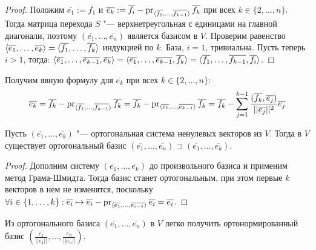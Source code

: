 \begin{proof}
	Положим $\overline{e_1} := \overline{f_1}$ и $\overline{e_k} := \overline{f_i} \hm{-} \pr_{\langle\overline{f_1}, \dots, \overline{f_{k - 1}}\rangle}\overline{f_k}$ при всех $k \in \{2, \dots, n\}$. Тогда матрица перехода $S$ "--- верхнетреугольная с единицами на главной диагонали, поэтому $(\overline{e_1}, \dotsc, \overline{e_n})$ является базисом в $V$. Проверим равенство $\langle\overline{e_1}, \dots, \overline{e_k}\rangle \hm= \langle\overline{f_1}, \dots, \overline{f_k}\rangle$ индукцией по $k$. База, $i = 1$, тривиальна. Пусть теперь $i > 1$, тогда: $\langle\overline{e_1}, \dots, \overline{e_{k-1}}, \overline{e_k}\rangle \hm= \langle\overline{e_1}, \dots, \overline{e_{k-1}}, \overline{f_k}\rangle = \langle\overline{f_1}, \dots, \overline{f_{k-1}}, \overline{f_i}\rangle$.
\end{proof}

\begin{note}
	Получим явную формулу для $\overline{e_k}$ при всех $k \in \{2, \dots, n\}$:
	\[\overline{e_k} = \overline{f_k} - \operatorname{pr}_{\langle\overline{f_1}, \dots, \overline{f_{k - 1}}\rangle}{\overline{f_k}} = \overline{f_k} - \operatorname{pr}_{\langle\overline{e_1}, \dots, \overline{e_{k - 1}}\rangle}{\overline{f_k}} = \overline{f_k} - \sum_{j = 1}^{k - 1}\frac{(\overline{f_k}, \overline{e_j})}{||\overline{e_j}||^2}\overline{e_j}\]
\end{note}

\begin{corollary}
	Пусть $(\overline{e_1}, \dots, \overline{e_k})$ "--- ортогональная система ненулевых векторов из $V$. Тогда в $V$ существует ортогональный базис $(\overline{e_1}, \dots, \overline{e_n}) \supset (\overline{e_1}, \dots, \overline{e_k})$.
\end{corollary}

\begin{proof}
	Дополним систему $(\overline{e_1}, \dots, \overline{e_k})$ до произвольного базиса и применим метод Грама-Шмидта. Тогда базис станет ортогональным, при этом первые $k$ векторов в нем не изменятся, поскольку $\forall i \hm{\in} \{1, \dots, k\}: \overline{e_i} \hm{\mapsto} \overline{e_i} - \pr_{\langle\overline{e_1}, \dots, \overline{e_{i - 1}}\rangle}{\overline{e_i}} = \overline{e_i}$.
\end{proof}

\begin{note}
	Из ортогонального базиса $(\overline{e_1}, \dots, \overline{e_n})$ в $V$ легко получить ортонормированный базис $(\frac{\overline{e_1}}{||\overline{e_1}||}, \dots, \frac{\overline{e_n}}{||\overline{e_n}||})$.
\end{note}


